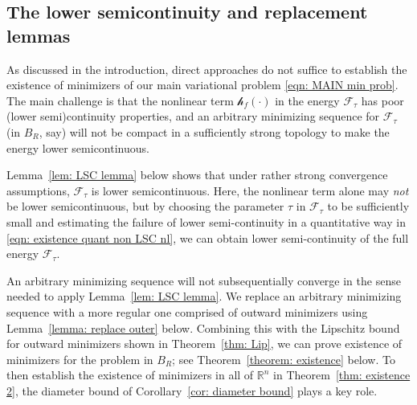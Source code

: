 \documentclass[10pt, reqno]{amsart}
\numberwithin{equation}{section}
\def\R{{\mathbb R}}
\def\err{\tau}
\def\Ep{\mathcal{F}_{\err}}
\def\nl{\mathscr{h}_f}
\begin{document}
%
%
%
%
%
%
%

\medskip


\subsection{The lower semicontinuity and replacement lemmas}
As discussed in the introduction, direct approaches do not suffice to  establish the existence of minimizers of our main variational problem \eqref{eqn: MAIN min prob}. 
The main challenge is that the nonlinear term $\nl(\cdot)$ in the energy $\Ep$ has  poor (lower semi)continuity properties, and an arbitrary minimizing sequence for $\Ep$ (in $B_R$, say) will not be compact in a sufficiently strong topology to make the energy lower semicontinuous. 

Lemma~\ref{lem: LSC lemma} below shows that under rather strong convergence assumptions, $\Ep$ is lower semicontinuous. Here, the nonlinear term alone may {\it not} be lower semicontinuous, but by choosing the parameter $\tau$ in $\Ep$ to be sufficiently small and estimating the failure of lower semi-continuity in a quantitative way in \eqref{eqn: existence quant non LSC nl}, we can obtain lower semi-continuity of the full energy $\Ep$.
 

An arbitrary minimizing sequence will not subsequentially converge in the sense needed to apply  Lemma~\ref{lem: LSC lemma}. 
We replace an arbitrary minimizing sequence with a more regular one comprised of outward minimizers using Lemma~\ref{lemma: replace outer} below. Combining this with the Lipschitz bound for outward minimizers shown in Theorem~\ref{thm: Lip}, we can prove existence of minimizers for the problem in $B_R$; see Theorem~\ref{theorem: existence} below.
To then establish the existence of minimizers in all of $\R^n$ in Theorem~\ref{thm: existence 2}, the diameter bound of Corollary~\ref{cor: diameter bound} plays a key role.
\end{document}
